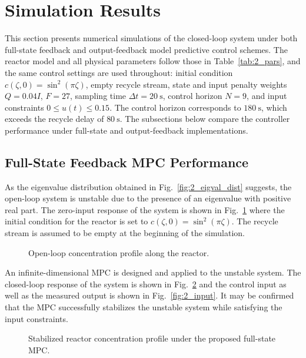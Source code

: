 \section{Simulation Results}

This section presents numerical simulations of the closed-loop system under both full-state feedback and output-feedback model predictive control schemes. The reactor model and all physical parameters follow those in Table~\ref{tab:2_pars}, and the same control settings are used throughout: initial condition $c(\zeta, 0) = \sin^2(\pi \zeta)$, empty recycle stream, state and input penalty weights $Q = 0.04 I$, $F = 27$, sampling time $\Delta t = 20~\mathrm{s}$, control horizon $N = 9$, and input constraints $0 \leq u(t) \leq 0.15$. The control horizon corresponds to $180~\mathrm{s}$, which exceeds the recycle delay of $80~\mathrm{s}$. The subsections below compare the controller performance under full-state and output-feedback implementations.

\subsection{Full-State Feedback MPC Performance}

As the eigenvalue distribution obtained in Fig.~\ref{fig:2_eigval_dist} suggests, the open-loop system is unstable due to the presence of an eigenvalue with positive real part. The zero-input response of the system is shown in Fig.~\ref{fig:2_open} where the initial condition for the reactor is set to $c(\zeta ,0) = \sin^2(\pi \zeta)$. The recycle stream is assumed to be empty at the beginning of the simulation.

\begin{figure}[!htbp]
    \centering
    
    \caption{Open-loop concentration profile along the reactor.}
    \label{fig:2_open}
\end{figure}

An infinite-dimensional MPC is designed and applied to the unstable system. The closed-loop response of the system is shown in Fig.~\ref{fig:2_closed} and the control input as well as the measured output is shown in Fig.~\ref{fig:2_input}. It may be confirmed that the MPC successfully stabilizes the unstable system while satisfying the input constraints.

\begin{figure}[!htbp]
    \centering
    
    \caption{Stabilized reactor concentration profile under the proposed full-state MPC.}
    \label{fig:2_closed}
\end{figure}

